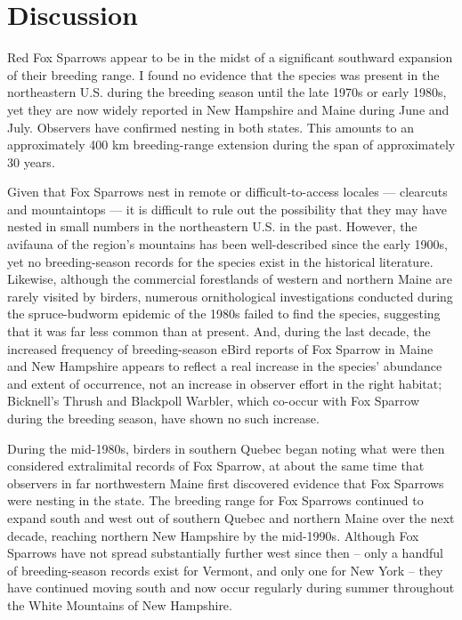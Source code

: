 \documentclass[fleqn,10pt,lineno]{wlpeerj} %
\begin{document}
\section*{Discussion}
Red Fox Sparrows appear to be in the midst of a significant southward expansion of their breeding range. I found no evidence that the species was present in the northeastern U.S. during the breeding season until the late 1970s or early 1980s, yet they are now widely reported in New Hampshire and Maine during June and July. Observers have confirmed nesting in both states. This amounts to an approximately 400 km breeding-range extension during the span of approximately 30 years. 

Given that Fox Sparrows nest in remote or difficult-to-access locales — clearcuts and mountaintops — it is difficult to rule out the possibility that they may have nested in small numbers in the northeastern U.S. in the past. However, the avifauna of the region’s mountains has been well-described since the early 1900s, yet no breeding-season records for the species exist in the historical literature. Likewise, although the commercial forestlands of western and northern Maine are rarely visited by birders, numerous ornithological investigations conducted during the spruce-budworm epidemic of the 1980s failed to find the species, suggesting that it was far less common than at present. And, during the last decade, the increased frequency of breeding-season eBird reports of Fox Sparrow in Maine and New Hampshire appears to reflect a real increase in the species’ abundance and extent of occurrence, not an increase in observer effort in the right habitat; Bicknell’s Thrush and Blackpoll Warbler, which co-occur with Fox Sparrow during the breeding season, have shown no such increase.

During the mid-1980s, birders in southern Quebec began noting what were then considered extralimital records of Fox Sparrow, at about the same time that observers in far northwestern Maine first discovered evidence that Fox Sparrows were nesting in the state. The breeding range for Fox Sparrows continued to expand south and west out of southern Quebec and northern Maine over the next decade, reaching northern New Hampshire by the mid-1990s. Although Fox Sparrows have not spread substantially further west since then – only a handful of breeding-season records exist for Vermont, and only one for New York – they have continued moving south and now occur regularly during summer throughout the White Mountains of New Hampshire.
\end{document}
